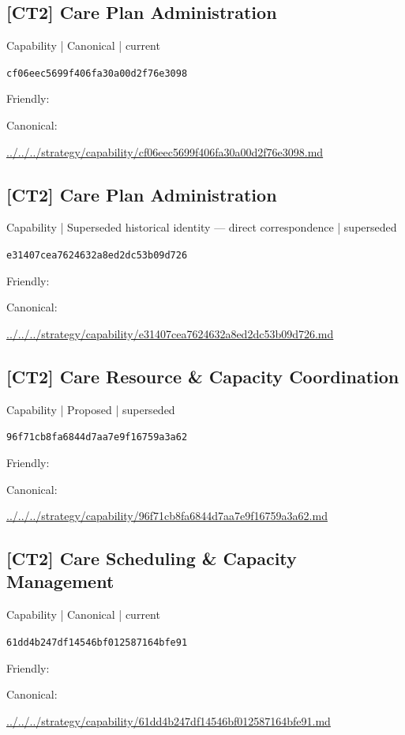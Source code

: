 \documentclass[10pt,a4paper]{article}
\begin{document}
\subsection*{[CT2] Care Plan Administration}
{\small Capability | Canonical | current}\par
\texttt{cf06eec5699f406fa30a00d2f76e3098}\par
Friendly: \par
Canonical: \par
{\footnotesize\url{../../../strategy/capability/cf06eec5699f406fa30a00d2f76e3098.md}}\par
\subsection*{[CT2] Care Plan Administration}
{\small Capability | Superseded historical identity — direct correspondence | superseded}\par
\texttt{e31407cea7624632a8ed2dc53b09d726}\par
Friendly: \par
Canonical: \par
{\footnotesize\url{../../../strategy/capability/e31407cea7624632a8ed2dc53b09d726.md}}\par
\subsection*{[CT2] Care Resource \& Capacity Coordination}
{\small Capability | Proposed | superseded}\par
\texttt{96f71cb8fa6844d7aa7e9f16759a3a62}\par
Friendly: \par
Canonical: \par
{\footnotesize\url{../../../strategy/capability/96f71cb8fa6844d7aa7e9f16759a3a62.md}}\par
\subsection*{[CT2] Care Scheduling \& Capacity Management}
{\small Capability | Canonical | current}\par
\texttt{61dd4b247df14546bf012587164bfe91}\par
Friendly: \par
Canonical: \par
{\footnotesize\url{../../../strategy/capability/61dd4b247df14546bf012587164bfe91.md}}\par
\end{document}
